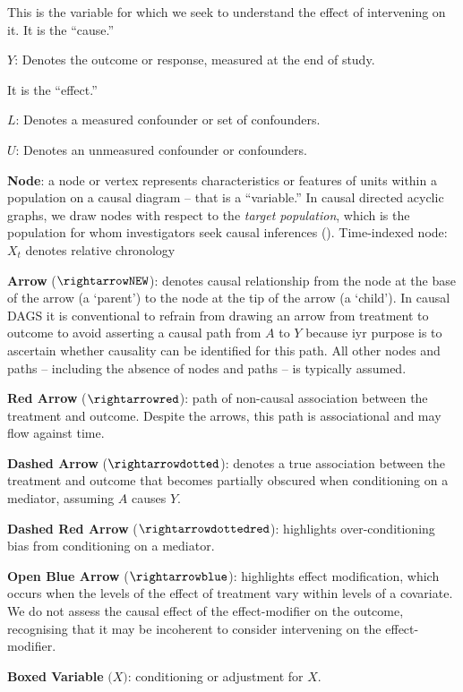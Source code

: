 \documentclass[
  single column]{article}
\begin{document}
This is the variable for which we seek to understand the effect of
intervening on it. It is the ``cause.''

\textbf{\(Y\)}: Denotes the outcome or response, measured at the end of
study.

It is the ``effect.''

\textbf{\(L\)}: Denotes a measured confounder or set of confounders.

\textbf{\(U\)}: Denotes an unmeasured confounder or confounders.

\textbf{Node}: a node or vertex represents characteristics or features
of units within a population on a causal diagram -- that is a
``variable.'' In causal directed acyclic graphs, we draw nodes with
respect to the \emph{target population}, which is the population for
whom investigators seek causal inferences
(). Time-indexed
node: \(X_t\) denotes relative chronology

\textbf{Arrow} (\(\rightarrowNEW\)): denotes causal relationship from
the node at the base of the arrow (a `parent') to the node at the tip of
the arrow (a `child'). In causal DAGS it is conventional to refrain from
drawing an arrow from treatment to outcome to avoid asserting a causal
path from \(A\) to \(Y\) because iyr purpose is to ascertain whether
causality can be identified for this path. All other nodes and paths --
including the absence of nodes and paths -- is typically assumed.

\textbf{Red Arrow} (\(\rightarrowred\)): path of non-causal association
between the treatment and outcome. Despite the arrows, this path is
associational and may flow against time.

\textbf{Dashed Arrow} (\(\rightarrowdotted\)): denotes a true
association between the treatment and outcome that becomes partially
obscured when conditioning on a mediator, assuming \(A\) causes \(Y\).

\textbf{Dashed Red Arrow} (\(\rightarrowdottedred\)): highlights
over-conditioning bias from conditioning on a mediator.

\textbf{Open Blue Arrow} (\(\rightarrowblue\)): highlights effect
modification, which occurs when the levels of the effect of treatment
vary within levels of a covariate. We do not assess the causal effect of
the effect-modifier on the outcome, recognising that it may be
incoherent to consider intervening on the effect-modifier.

\textbf{Boxed Variable} \(\big(\boxed{X}\big)\): conditioning or
adjustment for \(X\).
\end{document}
